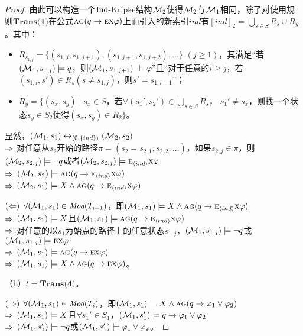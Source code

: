 \begin{proof}
	由此可以构造一个$\textrm{Ind}$-Kripke结构${\cal M}_2$使得${\cal M}_2$与${\cal M}_1$相同，除了对使用规则$\textbf{Trans(1)}$在公式$\textsc{a}\textsc{g}(q \rightarrow \textsc{e} \textsc{x} \varphi)$上而引入的新索引$ind$有$[ind]_2=\bigcup_{s\in S} R_s \cup R_y$。其中：
	\begin{itemize}
		\item $R_{s_{1,j}}=\{(s_{1,j}, s_{1,j+1}), (s_{1,j+1}, s_{1,j+2}),\dots\}$ $(j\geq 1)$，其满足“若$({\cal M}_1,s_{1,j}) \models q$，则$({\cal M}_1,s_{1,j+1})$ $\models \varphi$”且“对于任意的$i\geq j$，若$(s_{1,i}, s') \in R_s (s \not= s_{1,j})$，则$s'=s_{1,i+1}$”；
		\item $R_y=\{(s_x,s_y)\mid s_x\in S$，若$\forall(s_1',s_2') \in \bigcup_{s\in S} R_s$， $s_1'\not= s_x$，则找一个状态$s_y\in S_2$使得$(s_x,s_y)\in R_2\}$。
	\end{itemize}

显然，$({\cal M}_1,s_1) \leftrightarrow_{{\langle{\emptyset,\{ind\}}\rangle}} ({\cal M}_2,s_2)$\\
$\Rightarrow$ 对任意从$s_2$开始的路径$\pi=( s_2= s_{2,1} , s_{2,2}, \dots)$，如果$s_{2,j} \in \pi$，则$({\cal M}_2,s_{2,j}) \models \neg q$或者$({\cal M}_2,s_{2,j}) \models \textsc{e}_{{\langle{ind}\rangle}} \textsc{x} \varphi$\\
$\Rightarrow$ $({\cal M}_2,s_2)\models \textsc{a}\textsc{g}(q \rightarrow \textsc{e}_{{\langle{ind}\rangle}} \textsc{x} \varphi)$\\
$\Rightarrow$ $({\cal M}_2,s_1) \models X \wedge \textsc{a}\textsc{g}(q \rightarrow \textsc{e}_{{\langle{ind}\rangle}} \textsc{x} \varphi)$

$(\Leftarrow)$ $\forall ({\cal M}_1,s_1) \in \textit{Mod}(T_{i+1})$，即$({\cal M}_1,s_1) \models X \wedge \textsc{a} \textsc{g}(q \rightarrow \textsc{e}_{{\langle{ind}\rangle}} \textsc{x} \varphi )$\\
$\Rightarrow$ $({\cal M}_1,s_1) \models X$且$({\cal M}_1,s_1) \models \textsc{a} \textsc{g}(q \rightarrow \textsc{e}_{{\langle{ind}\rangle}} \textsc{x} \varphi)$\\
$\Rightarrow$ 对任意的以$s_1$为始点的路径上的任意状态$s_{1,j}$，$({\cal M}_1,s_{1,j}) \models \neg q$或$({\cal M}_1,s_{1,j}) \models \textsc{e}\textsc{x}\varphi$\\
$\Rightarrow$ $({\cal M}_1,s_1) \models \textsc{a}\textsc{g}(q \rightarrow \textsc{e} \textsc{x} \varphi)$\\
$\Rightarrow$ $({\cal M}_1,s_1) \models X \wedge \textsc{a}\textsc{g}(q \rightarrow \textsc{e} \textsc{x} \varphi)$。

	（b）$t=\textbf{Trans(4)}$。
	
   $(\Rightarrow)$	$\forall({\cal M}_1,s_1) \in \textit{Mod}(T_i)$，即$({\cal M}_1,s_1) \models X \wedge \textsc{a}\textsc{g} (q \rightarrow \varphi_1 \vee \varphi_2)$ \\
   $\Rightarrow$ $({\cal M}_1,s_1) \models X$且$\forall s_1'\in S_1$，$({\cal M}_1, s_1') \models q \rightarrow \varphi_1 \vee \varphi_2$\\
   $\Rightarrow$ $({\cal M}_1,s_1')\models \neg q$或$({\cal M}_1,s_1')\models \varphi_1 \vee \varphi_2$。
   

\end{proof}
